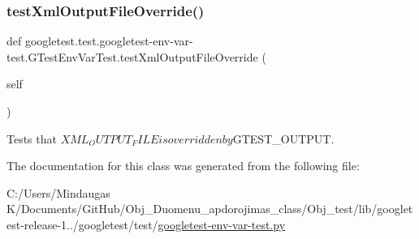 \subsubsection{\texorpdfstring{testXmlOutputFileOverride()}{testXmlOutputFileOverride()}}
{\footnotesize\ttfamily def googletest.\+test.\+googletest-\/env-\/var-\/test.\+G\+Test\+Env\+Var\+Test.\+test\+Xml\+Output\+File\+Override (\begin{DoxyParamCaption}\item[{}]{self }\end{DoxyParamCaption})}

\begin{DoxyVerb}Tests that $XML_OUTPUT_FILE is overridden by $GTEST_OUTPUT.\end{DoxyVerb}
 

The documentation for this class was generated from the following file\+:\begin{DoxyCompactItemize}
\item 
C\+:/\+Users/\+Mindaugas K/\+Documents/\+Git\+Hub/\+Obj\+\_\+\+Duomenu\+\_\+apdorojimas\+\_\+class/\+Obj\+\_\+test/lib/googletest-\/release-\/1../googletest/test/\mbox{\hyperlink{_obj__test_2lib_2googletest-release-1_88_81_2googletest_2test_2googletest-env-var-test_8py}{googletest-\/env-\/var-\/test.\+py}}\end{DoxyCompactItemize}
